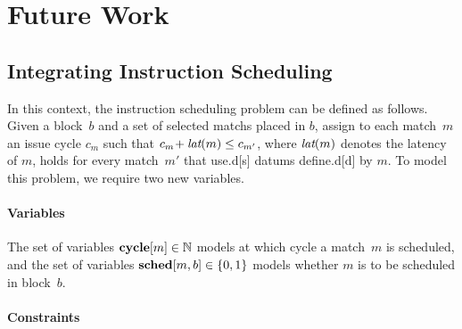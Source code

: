 %

\chapter{Future Work}




\section{Integrating Instruction Scheduling}

In this context, the \gls{instruction scheduling} problem can be defined as
follows.
%
Given a \gls{block}~$b$ and a set of selected \glspl{match} placed in
$b$\hspace{-1pt}, assign to each \gls{match}~$m$ an issue cycle $c_m$ such that
\mbox{$c_m \!+ \operatorname{\textit{lat}}(m) \leq c_{m'}$}, where $\operatorname{\textit{lat}}(m)$ denotes the latency of
$m$\hspace{-1pt}, holds for every \gls{match}~$m'$ that \gls{use.d}[s]
\glspl{datum} \gls{define.d}[d] by $m$\hspace{-1pt}.
%
To model this problem, we require two new \glspl{variable}.


\subsubsection{Variables}

The set of \glspl{variable} \mbox{$\mVar{cycle}[m] \in \mNatNumSet$} models at
which cycle a \gls{match}~$m$ is scheduled, and the set of \glspl{variable}
\mbox{$\mVar{sched}[m, b] \in \mSet{0, 1}$} models whether $m$ is to be
scheduled in \gls{block}~$b$\hspace{-1pt}.


\subsubsection{Constraints}

